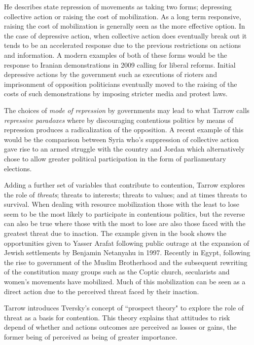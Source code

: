 \documentclass[12pt, a4paper]{article}
\begin{document}
He describes state repression of movements as taking two forms; depressing collective action or raising the cost of mobilization. As a long term responsive, raising the cost of mobilization is generally seen as the more effective option. In the case of depressive action, when collective action does eventually break out it tends to be an accelerated response due to the previous restrictions on actions and information. A modern examples of both of these forms would be the response to Iranian demonstrations in 2009 calling for liberal reforms. Initial depressive actions by the government such as executions of rioters and imprisonment of opposition politicians eventually moved to the raising of the costs of such demonstrations by imposing stricter media and protest laws.\citep{iran}

The choices of \emph{mode of repression} by governments may lead to what Tarrow calls \emph{repressive paradoxes} where by discouraging contentious politics by means of repression produces a radicalization of the opposition. A recent example of this would be the comparison between Syria who's suppression of collective action gave rise to an armed struggle with the country and Jordan which alternatively chose to allow greater political participation in the form of parliamentary elections. \citep{black}

Adding a further set of variables that contribute to contention, Tarrow explores the role of \emph{threats}; threats to interests; threats to values; and at times threats to survival. When dealing with resource mobilization those with the least to lose seem to be the most likely to participate in contentious politics, but the reverse can also be true where those with the most to lose are also those faced with the greatest threat due to inaction. The example given in the book shows the opportunities given to Yasser Arafat following public outrage at the expansion of Jewish settlements by Benjamin Netanyahu in 1997. Recently in Egypt, following  the rise to government of the Muslim Brotherhood and the subsequent rewriting of the constitution many groups such as the Coptic church, secularists and women's movements have mobilized. Much of this mobilization can be seen as a direct action due to the perceived threat faced by their inaction. \citep{egypt}

Tarrow introduces Tversky's concept of ``prospect theory" to explore the role of threat as a basis for contention. This theory explains that attitudes to risk depend of whether and actions outcomes are perceived as losses or gains, the former being of perceived as being of greater importance. 
\end{document}

